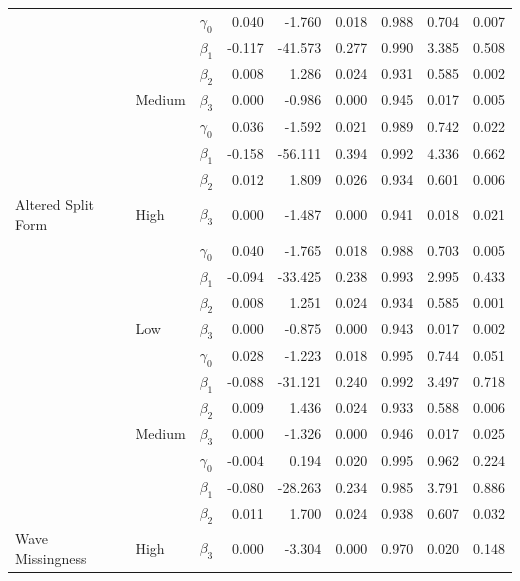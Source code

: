\documentclass{svjour3}\usepackage[]{graphicx}\usepackage[]{color}
\newenvironment{knitrout}{}{} %
\begin{document}
\begin{knitrout}
\begin{table}[!h]
{\begin{tabular}[t]{l|l|l|r|r|r|r|r|r}
\cline{2-9}
 &  & $\gamma_0$ & 0.040 & -1.760 & 0.018 & 0.988 & 0.704 & 0.007\\
\cline{3-9}
 &  & $\beta_1$ & -0.117 & -41.573 & 0.277 & 0.990 & 3.385 & 0.508\\
\cline{3-9}
 &  & $\beta_2$ & 0.008 & 1.286 & 0.024 & 0.931 & 0.585 & 0.002\\
\cline{3-9}
 & \multirow{-4}{*}{\raggedright\arraybackslash Medium} & $\beta_3$ & 0.000 & -0.986 & 0.000 & 0.945 & 0.017 & 0.005\\
\cline{2-9}
 &  & $\gamma_0$ & 0.036 & -1.592 & 0.021 & 0.989 & 0.742 & 0.022\\
\cline{3-9}
 &  & $\beta_1$ & -0.158 & -56.111 & 0.394 & 0.992 & 4.336 & 0.662\\
\cline{3-9}
 &  & $\beta_2$ & 0.012 & 1.809 & 0.026 & 0.934 & 0.601 & 0.006\\
\cline{3-9}
\multirow{-12}{*}{\raggedright\arraybackslash Altered Split Form} & \multirow{-4}{*}{\raggedright\arraybackslash High} & $\beta_3$ & 0.000 & -1.487 & 0.000 & 0.941 & 0.018 & 0.021\\
\cline{1-9}
 &  & $\gamma_0$ & 0.040 & -1.765 & 0.018 & 0.988 & 0.703 & 0.005\\
\cline{3-9}
 &  & $\beta_1$ & -0.094 & -33.425 & 0.238 & 0.993 & 2.995 & 0.433\\
\cline{3-9}
 &  & $\beta_2$ & 0.008 & 1.251 & 0.024 & 0.934 & 0.585 & 0.001\\
\cline{3-9}
 & \multirow{-4}{*}{\raggedright\arraybackslash Low} & $\beta_3$ & 0.000 & -0.875 & 0.000 & 0.943 & 0.017 & 0.002\\
\cline{2-9}
 &  & $\gamma_0$ & 0.028 & -1.223 & 0.018 & 0.995 & 0.744 & 0.051\\
\cline{3-9}
 &  & $\beta_1$ & -0.088 & -31.121 & 0.240 & 0.992 & 3.497 & 0.718\\
\cline{3-9}
 &  & $\beta_2$ & 0.009 & 1.436 & 0.024 & 0.933 & 0.588 & 0.006\\
\cline{3-9}
 & \multirow{-4}{*}{\raggedright\arraybackslash Medium} & $\beta_3$ & 0.000 & -1.326 & 0.000 & 0.946 & 0.017 & 0.025\\
\cline{2-9}
 &  & $\gamma_0$ & -0.004 & 0.194 & 0.020 & 0.995 & 0.962 & 0.224\\
\cline{3-9}
 &  & $\beta_1$ & -0.080 & -28.263 & 0.234 & 0.985 & 3.791 & 0.886\\
\cline{3-9}
 &  & $\beta_2$ & 0.011 & 1.700 & 0.024 & 0.938 & 0.607 & 0.032\\
\cline{3-9}
\multirow{-12}{*}{\raggedright\arraybackslash Wave Missingness} & \multirow{-4}{*}{\raggedright\arraybackslash High} & $\beta_3$ & 0.000 & -3.304 & 0.000 & 0.970 & 0.020 & 0.148\\
\hline
\end{tabular}}
\end{table}


\end{knitrout}
\end{document}
